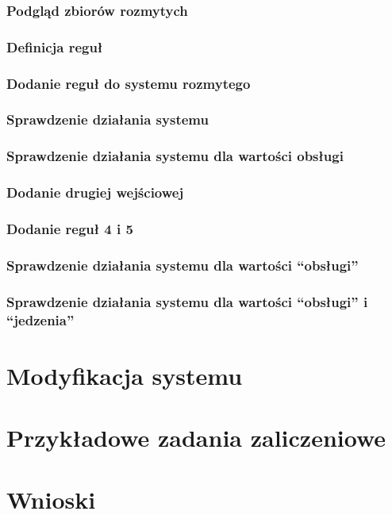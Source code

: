 \documentclass[a4paper, 10pt]{article}
\begin{document}
\subsubsection{Podgląd zbiorów rozmytych}
\subsubsection{Definicja reguł}
\subsubsection{Dodanie reguł do systemu rozmytego}
\subsubsection{Sprawdzenie działania systemu}
\subsubsection{Sprawdzenie działania systemu dla wartości obsługi}
\subsubsection{Dodanie drugiej wejściowej}
\subsubsection{Dodanie reguł 4 i 5}
\subsubsection{Sprawdzenie działania systemu dla wartości ``obsługi''}
\subsubsection{Sprawdzenie działania systemu dla wartości ``obsługi'' i ``jedzenia''}


\section{Modyfikacja systemu}\label{c2}

\section{Przykładowe zadania zaliczeniowe}\label{c3}

\section{Wnioski}
\end{document}
